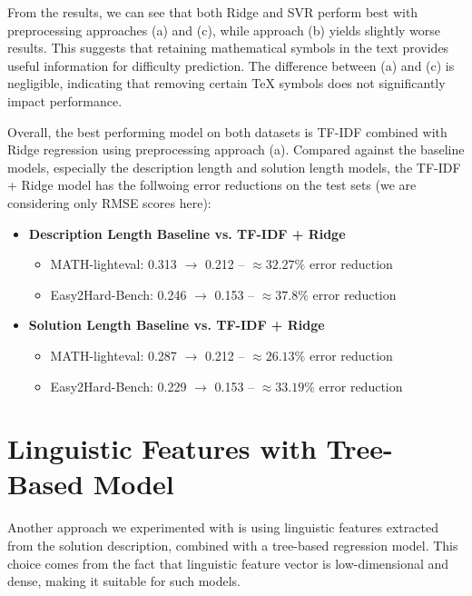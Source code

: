 \documentclass[runningheads]{llncs}
\begin{document}
\vspace{5pt}

From the results, we can see that both Ridge and SVR perform best with preprocessing approaches (a) and (c), while approach (b) yields slightly worse results. This suggests that retaining mathematical symbols in the text provides useful information for difficulty prediction. The difference between (a) and (c) is negligible, indicating that removing certain \TeX{} symbols does not significantly impact performance.

Overall, the best performing model on both datasets is TF-IDF combined with Ridge regression using preprocessing approach (a). Compared against the baseline models, especially the description length and solution length models, the TF-IDF + Ridge model has the follwoing error reductions on the test sets (we are considering only RMSE scores here):

\begin{itemize}
    \item \textbf{Description Length Baseline vs. TF-IDF + Ridge}
    \begin{itemize}
        \item MATH-lighteval: 0.313 $\to$ 0.212 -- $\approx 32.27\%$ error reduction
        \item Easy2Hard-Bench: 0.246 $\to$ 0.153 -- $\approx 37.8\%$ error reduction
    \end{itemize}

\vspace{10pt}

    \item \textbf{Solution Length Baseline vs. TF-IDF + Ridge}
    \begin{itemize}
        \item MATH-lighteval: 0.287 $\to$ 0.212 -- $\approx 26.13\%$ error reduction
        \item Easy2Hard-Bench: 0.229 $\to$ 0.153 -- $\approx 33.19\%$ error reduction
    \end{itemize}
\end{itemize}


\section{Linguistic Features with Tree-Based Model}
\label{sec:linguistic}

Another approach we experimented with is using linguistic features extracted from the solution description, combined with a tree-based regression model. This choice comes from the fact that linguistic feature vector is low-dimensional and dense, making it suitable for such models.
\end{document}
